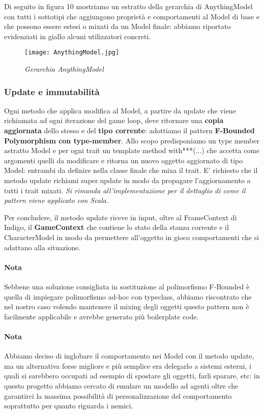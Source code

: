 Di seguito in figura 10 mostriamo un estratto della gerarchia di AnythingModel con tutti i sottotipi che aggiungono proprietà e comportamenti al Model di base e che possono essere estesi o mixati da un Model finale: abbiamo riportato evidenziati in giallo alcuni utilizzatori concreti.

\begin{figure}[!hbt]
    \centering
    \texttt{[image: AnythingModel.jpg]}
    \caption{\textit{Gerarchia AnythingModel}} 
\end{figure}

\subsubsection{Update e immutabilità}

Ogni metodo che applica modifica al Model, a partire da update che viene richiamata ad ogni iterazione del game loop, deve ritornare una \textbf{copia aggiornata} dello stesso e del \textbf{tipo corrente}: adottiamo il pattern \textbf{F-Bounded Polymorphism con type-member}. 
Allo scopo predisponiamo un type member astratto Model e per ogni trait un template method with***(...) che accetta come argomenti quelli da modificare e ritorna un nuovo oggetto aggiornato di tipo Model: entrambi da definire nella classe finale che mixa il trait.
E' richiesto che il metodo update richiami super.update in modo da propagare l'aggiornamento a tutti i trait mixati.
\textit{Si rimanda all'implementazione per il dettaglio di come il pattern viene applicato con Scala.}

Per concludere, il metodo update riceve in input, oltre al FrameContext di Indigo, il \textbf{GameContext} che contiene lo stato della stanza corrente e il CharacterModel in modo da permettere all'oggetto in gioco comportamenti che si adattano alla situazione.

\paragraph{Nota} Sebbene una soluzione consigliata in sostituzione al polimorfismo F-Bounded è quella di impiegare polimorfismo ad-hoc con typeclass, abbiamo riscontrato che nel nostro caso volendo mantenere il mixing degli oggetti questo pattern non è facilmente applicabile e avrebbe generato più boilerplate code.

\paragraph{Nota}
Abbiamo deciso di inglobare il comportamento nei Model con il metodo update, ma un alternativa forse migliore e più semplice era delegarlo a sistemi esterni, i quali si sarebbero occupati ad esempio di spostare gli oggetti, farli sparare, etc: in questo progetto abbiamo cercato di emulare un modello ad agenti oltre che garantirci la massima possibilità di personalizzazione del comportamento soprattutto per quanto riguarda i nemici. 

